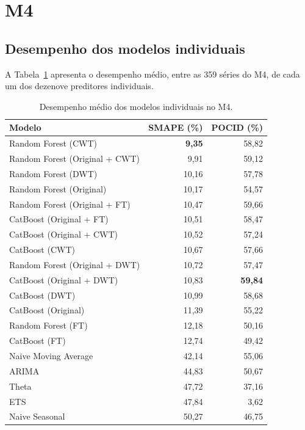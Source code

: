 \section{M4} \label{sec:resultados-m4}

\subsection{Desempenho dos modelos individuais}

A Tabela~\ref{tab:m4-individual} apresenta o desempenho médio, entre as 359 séries do M4, de cada um dos dezenove preditores individuais.

\begin{table}[H]
\small
\centering
\caption{Desempenho médio dos modelos individuais no M4.}
\label{tab:m4-individual}
\begin{tabular}{@{}lrr@{}}
\toprule
\textbf{Modelo} & \textbf{SMAPE (\%)} & \textbf{POCID (\%)} \\
\midrule
Random Forest (CWT)                  & \textbf{9,35} & 58,82 \\
Random Forest (Original + CWT)       & 9,91  & 59,12 \\
Random Forest (DWT)                  & 10,16 & 57,78 \\
Random Forest (Original)             & 10,17 & 54,57 \\
Random Forest (Original + FT)        & 10,47 & 59,66 \\
CatBoost (Original + FT)             & 10,51 & 58,47 \\
CatBoost (Original + CWT)            & 10,52 & 57,24 \\
CatBoost (CWT)                       & 10,67 & 57,66 \\
Random Forest (Original + DWT)       & 10,72 & 57,47 \\
CatBoost (Original + DWT)            & 10,83 & \textbf{59,84} \\
CatBoost (DWT)                       & 10,99 & 58,68 \\
CatBoost (Original)                  & 11,39 & 55,22 \\
Random Forest (FT)                   & 12,18 & 50,16 \\
CatBoost (FT)                        & 12,74 & 49,42 \\
Naive Moving Average                 & 42,14 & 55,06 \\
ARIMA                                & 44,83 & 50,67 \\
Theta                                & 47,72 & 37,16 \\
ETS                                  & 47,84 & 3,62 \\
Naive Seasonal                       & 50,27 & 46,75 \\
\bottomrule
\end{tabular}
\end{table}

